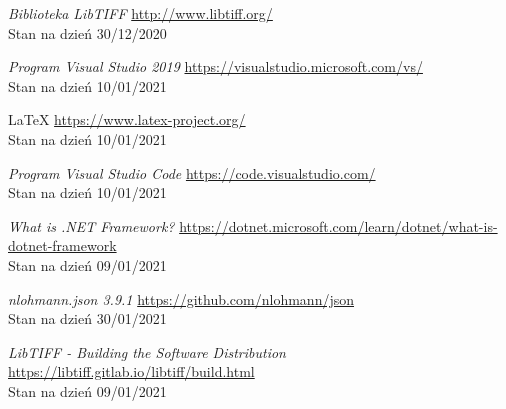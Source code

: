 \documentclass{article}
\begin{document}
\begin{thebibliography}{9}
        \textit{Biblioteka LibTIFF}
        \url{http://www.libtiff.org/}\\
        Stan na dzień 30/12/2020

        \textit{Program Visual Studio 2019}
        \url{https://visualstudio.microsoft.com/vs/}\\
        Stan na dzień 10/01/2021

        \LaTeX \space
        \url{https://www.latex-project.org/}\\
        Stan na dzień 10/01/2021

        \textit{Program Visual Studio Code}
        \url{https://code.visualstudio.com/}\\
        Stan na dzień 10/01/2021

        \textit{What is .NET Framework?}
        \url{https://dotnet.microsoft.com/learn/dotnet/what-is-dotnet-framework}\\
        Stan na dzień 09/01/2021

        \textit{nlohmann.json 3.9.1}
        \url{https://github.com/nlohmann/json}\\
        Stan na dzień 30/01/2021

        \textit{LibTIFF - Building the Software Distribution}
        \url{https://libtiff.gitlab.io/libtiff/build.html}\\
        Stan na dzień 09/01/2021

    \end{thebibliography}
    \newpage
    \listoffigures
\end{document}
